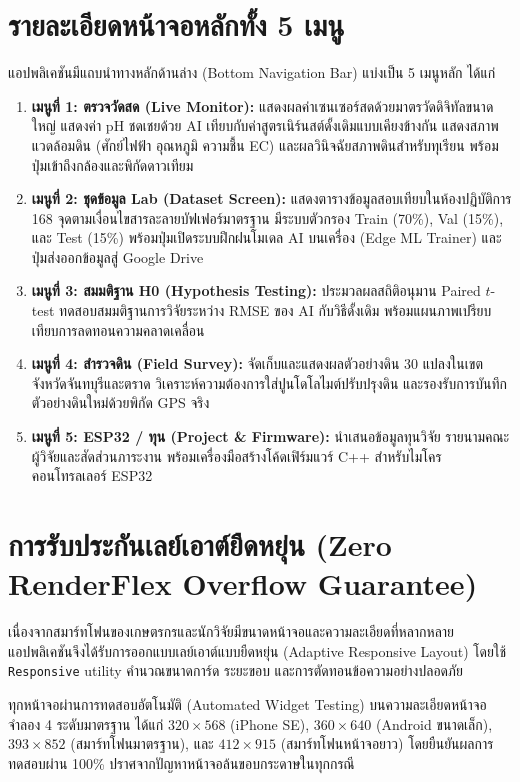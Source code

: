 \section{รายละเอียดหน้าจอหลักทั้ง 5 เมนู}
แอปพลิเคชันมีแถบนำทางหลักด้านล่าง (Bottom Navigation Bar) แบ่งเป็น 5 เมนูหลัก ได้แก่
\begin{enumerate}
    \item \textbf{เมนูที่ 1: ตรวจวัดสด (Live Monitor):} แสดงผลค่าเซนเซอร์สดด้วยมาตรวัดดิจิทัลขนาดใหญ่ แสดงค่า pH ชดเชยด้วย AI เทียบกับค่าสูตรเนิร์นสต์ดั้งเดิมแบบเคียงข้างกัน แสดงสภาพแวดล้อมดิน (ศักย์ไฟฟ้า อุณหภูมิ ความชื้น EC) และผลวินิจฉัยสภาพดินสำหรับทุเรียน พร้อมปุ่มเข้าถึงกล้องและพิกัดดาวเทียม
    \item \textbf{เมนูที่ 2: ชุดข้อมูล Lab (Dataset Screen):} แสดงตารางข้อมูลสอบเทียบในห้องปฏิบัติการ 168 จุดตามเงื่อนไขสารละลายบัฟเฟอร์มาตรฐาน มีระบบตัวกรอง Train (70\%), Val (15\%), และ Test (15\%) พร้อมปุ่มเปิดระบบฝึกฝนโมเดล AI บนเครื่อง (Edge ML Trainer) และปุ่มส่งออกข้อมูลสู่ Google Drive
    \item \textbf{เมนูที่ 3: สมมติฐาน H0 (Hypothesis Testing):} ประมวลผลสถิติอนุมาน Paired $t$-test ทดสอบสมมติฐานการวิจัยระหว่าง RMSE ของ AI กับวิธีดั้งเดิม พร้อมแผนภาพเปรียบเทียบการลดทอนความคลาดเคลื่อน
    \item \textbf{เมนูที่ 4: สำรวจดิน (Field Survey):} จัดเก็บและแสดงผลตัวอย่างดิน 30 แปลงในเขตจังหวัดจันทบุรีและตราด วิเคราะห์ความต้องการใส่ปูนโดโลไมต์ปรับปรุงดิน และรองรับการบันทึกตัวอย่างดินใหม่ด้วยพิกัด GPS จริง
    \item \textbf{เมนูที่ 5: ESP32 / ทุน (Project \& Firmware):} นำเสนอข้อมูลทุนวิจัย รายนามคณะผู้วิจัยและสัดส่วนภาระงาน พร้อมเครื่องมือสร้างโค้ดเฟิร์มแวร์ C++ สำหรับไมโครคอนโทรลเลอร์ ESP32
\end{enumerate}

\section{การรับประกันเลย์เอาต์ยืดหยุ่น (Zero RenderFlex Overflow Guarantee)}
เนื่องจากสมาร์ทโฟนของเกษตรกรและนักวิจัยมีขนาดหน้าจอและความละเอียดที่หลากหลาย แอปพลิเคชันจึงได้รับการออกแบบเลย์เอาต์แบบยืดหยุ่น (Adaptive Responsive Layout) โดยใช้ \texttt{Responsive} utility คำนวณขนาดการ์ด ระยะขอบ และการตัดทอนข้อความอย่างปลอดภัย

ทุกหน้าจอผ่านการทดสอบอัตโนมัติ (Automated Widget Testing) บนความละเอียดหน้าจอจำลอง 4 ระดับมาตรฐาน ได้แก่ $320 \times 568$ (iPhone SE), $360 \times 640$ (Android ขนาดเล็ก), $393 \times 852$ (สมาร์ทโฟนมาตรฐาน), และ $412 \times 915$ (สมาร์ทโฟนหน้าจอยาว) โดยยืนยันผลการทดสอบผ่าน 100\% ปราศจากปัญหาหน้าจอล้นขอบกระดาษในทุกกรณี

\clearpage
